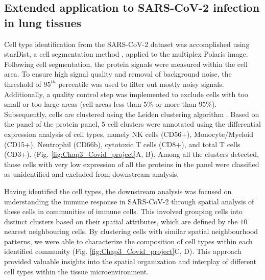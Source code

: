 \subsection{Extended application to SARS-CoV-2 infection in lung tissues}
Cell type identification from the SARS-CoV-2 dataset was accomplished using starDist, a cell segmentation method \cite{schmidt2018cell}, applied to the multiplex Polaris image. Following cell segmentation, the protein signals were measured within the cell area. To ensure high signal quality and removal of background noise, the threshold of $95^{th}$ percentile was used to filter out mostly noisy signals. Additionally, a quality control step was implemented to exclude cells with too small or too large areas (cell areas less than $5\%$ or more than $95\%$). Subsequently, cells are clustered using the Leiden clustering algorithm \cite{wolf2018scanpy}. Based on the panel of the protein panel, $5$ cell clusters were annotated using the differential expression analysis of cell types, namely NK cells (CD56+), Monocyte/Myeloid (CD15+), Neutrophil (CD66b), cytotoxic T cells (CD8+), and total T cells (CD3+). (Fig. \ref{fig:Chap3_Covid_project}A, B). Among all the clusters detected, those cells with very low expression of all the proteins in the panel were classified as unidentified and excluded from downstream analysis.

Having identified the cell types, the downstream analysis was focused on understanding the immune response in SARS-CoV-2 through spatial analysis of these cells in communities of immune cells. This involved grouping cells into distinct clusters based on their spatial attributes, which are defined by the $10$ nearest neighbouring cells. By clustering cells with similar spatial neighbourhood patterns, we were able to characterize the composition of cell types within each identified community (Fig. \ref{fig:Chap3_Covid_project}C, D). This approach provided valuable insights into the spatial organization and interplay of different cell types within the tissue microenvironment.

